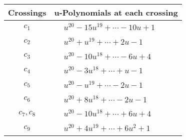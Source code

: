 \documentclass[1p]{elsarticle_modified}
\theoremstyle{definition}
\begin{document}
\begin{tabular}{m{50pt}|m{274pt}}
Crossings & \hspace{64pt}u-Polynomials at each crossing \\
\hline $$\begin{aligned}c_{1}\end{aligned}$$&$\begin{aligned}
&u^{20}-15 u^{19}+\cdots-10 u+1
\end{aligned}$\\
\hline $$\begin{aligned}c_{2}\end{aligned}$$&$\begin{aligned}
&u^{20}+u^{19}+\cdots+2 u-1
\end{aligned}$\\
\hline $$\begin{aligned}c_{3}\end{aligned}$$&$\begin{aligned}
&u^{20}-10 u^{18}+\cdots-6 u+4
\end{aligned}$\\
\hline $$\begin{aligned}c_{4}\end{aligned}$$&$\begin{aligned}
&u^{20}-3 u^{18}+\cdots+u-1
\end{aligned}$\\
\hline $$\begin{aligned}c_{5}\end{aligned}$$&$\begin{aligned}
&u^{20}- u^{19}+\cdots-2 u-1
\end{aligned}$\\
\hline $$\begin{aligned}c_{6}\end{aligned}$$&$\begin{aligned}
&u^{20}+8 u^{18}+\cdots-2 u-1
\end{aligned}$\\
\hline $$\begin{aligned}c_{7},c_{8}\end{aligned}$$&$\begin{aligned}
&u^{20}-10 u^{18}+\cdots+6 u+4
\end{aligned}$\\
\hline $$\begin{aligned}c_{9}\end{aligned}$$&$\begin{aligned}
&u^{20}+4 u^{19}+\cdots+6 u^2+1
\end{aligned}$\\

\end{tabular}
\end{document}
